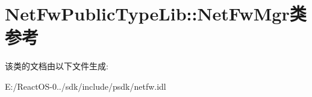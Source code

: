 \hypertarget{class_net_fw_public_type_lib_1_1_net_fw_mgr}{}\section{Net\+Fw\+Public\+Type\+Lib\+:\+:Net\+Fw\+Mgr类 参考}
\label{class_net_fw_public_type_lib_1_1_net_fw_mgr}


该类的文档由以下文件生成\+:\begin{DoxyCompactItemize}
\item 
E\+:/\+React\+O\+S-\/0../sdk/include/psdk/netfw.\+idl\end{DoxyCompactItemize}
